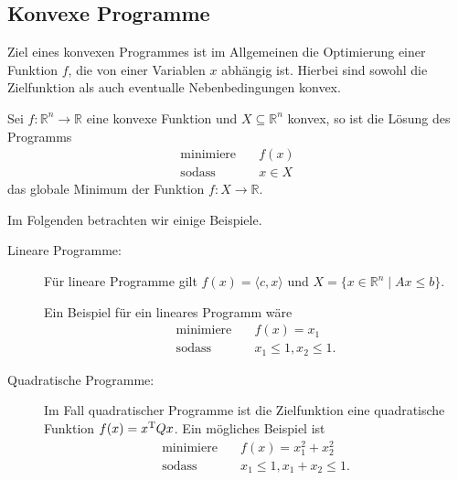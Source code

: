 \subsection{Konvexe Programme}
Ziel eines konvexen Programmes ist im Allgemeinen die Optimierung einer Funktion $f$, die von einer Variablen $x$ abhängig ist. Hierbei sind sowohl die Zielfunktion als auch eventualle Nebenbedingungen konvex.

\begin{Def}
Sei $f: \mathbb{R}^{n} \rightarrow \mathbb{R}$ eine konvexe Funktion und $X \subseteq \mathbb{R}^{n}$ konvex, so ist die Lösung des Programms
\begin{align*}
  \text{minimiere}  \quad& f(x)\\
  \text{sodass} \quad & x\in X
\end{align*}
das globale Minimum der Funktion $f : X\rightarrow \mathbb{R}$.
\end{Def}
\noindent Im Folgenden betrachten wir einige Beispiele.
\medskip

\begin{description}
\item[Lineare Programme:] Für lineare Programme gilt $f(x) = \langle c, x\rangle$ und $X = \{x\in \mathbb{R}^n \mid Ax \leq b\}$.

Ein Beispiel für ein lineares Programm wäre
\begin{align*}
  \text{minimiere}  \quad& f(x) = x_1\\
  \text{sodass} \quad & x_1\leq 1, x_2\leq 1.
\end{align*}

\item[Quadratische Programme:]
Im Fall quadratischer Programme ist die Zielfunktion eine quadratische Funktion $f(x) = x^{\rm T} Q x$. Ein mögliches Beispiel ist
\begin{align*}
  \text{minimiere}  \quad& f(x) = x_1^2 + x_2^2\\
  \text{sodass} \quad & x_1\leq 1, x_1 + x_2\leq 1.
\end{align*}
\end{description}

